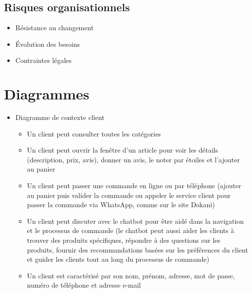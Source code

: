 \documentclass[12pt,a4paper]{article}
\begin{document}
\subsection{Risques organisationnels}

\begin{itemize}
\item Résistance au changement
\item Évolution des besoins
\item Contraintes légales
\end{itemize}

\section{Diagrammes}

\begin{itemize}
\item Diagramme de contexte client 
\begin{itemize}[label=\textbullet]
    \item Un client peut consulter toutes les catégories
    \item Un client peut ouvrir la fenêtre d'un article pour voir les détails (description, prix, avis), donner un avis, le noter par étoiles et l'ajouter au panier
    \item Un client peut passer une commande en ligne ou par téléphone (ajouter au panier puis valider la commande ou appeler le service client pour passer la commande via WhatsApp, comme sur le site Dokani)
    \item Un client peut discuter avec le chatbot pour être aidé dans la navigation et le processus de commande (le chatbot peut aussi aider les clients à trouver des produits spécifiques, répondre à des questions sur les produits, fournir des recommandations basées sur les préférences du client et guider les clients tout au long du processus de commande)
    \item Un client est caractérisé par son nom, prénom, adresse, mot de passe, numéro de téléphone et adresse e-mail
\end{itemize}


\end{itemize}
\end{document}
